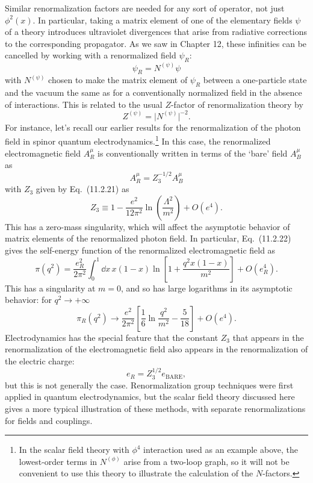 Similar renormalization factors are needed for any sort of operator, not just
$\phi^2(x)$. In particular, taking a matrix element of one of the elementary
fields $\psi$ of a theory introduces ultraviolet divergences that arise from
radiative corrections to the corresponding propagator. As we saw in Chapter
12, these infinities can be cancelled by working with a renormalized field
$\psi_R$:
\begin{equation}
 \psi_R=N^{(\psi)}\psi
 \tag{18.1.14}
 \label{eq:18.1.14}
\end{equation}
with $N^{(\psi)}$ chosen to make the matrix element of $\psi_R$ between a
one-particle state and the vacuum the same as for a conventionally normalized
field in the absence of interactions. This is related to the usual $Z$-factor
of renormalization theory by
\begin{equation}
 Z^{(\psi)}=\lvert N^{(\psi)}\rvert^{-2} .
 \tag{18.1.15}
 \label{eq:18.1.15}
\end{equation}
For instance, let's recall our earlier results for the renormalization of the
photon field in spinor quantum electrodynamics.\footnote{In the scalar field
theory with $\phi^4$ interaction used as an example above, the lowest-order
terms in $N^{(\phi)}$ arise from a two-loop graph, so it will not be convenient
to use this theory to illustrate the calculation of the $N$-factors.} In this
case, the renormalized electromagnetic field $A_R^\mu$ is conventionally
written in terms of the `bare' field $A_B^\mu$ as
\[
 A_R^\mu=Z_3^{-1/2}A_B^\mu
\]
with $Z_3$ given by Eq.~(11.2.21) as
\begin{equation}
 Z_3\equiv1-\frac{e^2}{12\pi^2}\ln\left(\frac{\Lambda^2}{m^2}\right)
 +O(e^4) .
 \tag{18.1.16}
 \label{eq:18.1.16}
\end{equation}
This has a zero-mass singularity, which will affect the asymptotic behavior of
matrix elements of the renormalized photon field. In particular,
Eq.~(11.2.22) gives the self-energy function of the renormalized
electromagnetic field as
\begin{equation}
 \pi(q^2)=\frac{e_R^2}{2\pi^2}\int_0^1\dd x\,x(1-x)
 \ln\left[1+\frac{q^2x(1-x)}{m^2}\right]+O(e_R^4) .
 \tag{18.1.17}
 \label{eq:18.1.17}
\end{equation}
This has a singularity at $m=0$, and so has large logarithms in its
asymptotic behavior: for $q^2\to+\infty$
\begin{equation}
 \pi_R(q^2)\longrightarrow\frac{e^2}{2\pi^2}
 \left[\frac{1}{6}\ln\frac{q^2}{m^2}-\frac{5}{18}\right]+O(e^4) .
 \tag{18.1.18}
 \label{eq:18.1.18}
\end{equation}
Electrodynamics has the special feature that the constant $Z_3$ that appears
in the renormalization of the electromagnetic field also appears in the
renormalization of the electric charge:
\begin{equation}
 e_R=Z_3^{1/2}e_{\mathrm{BARE}} ,
 \tag{18.1.19}
 \label{eq:18.1.19}
\end{equation}
but this is not generally the case. Renormalization group techniques were
first applied in quantum electrodynamics, but the scalar field theory
discussed here gives a more typical illustration of these methods, with
separate renormalizations for fields and couplings.
